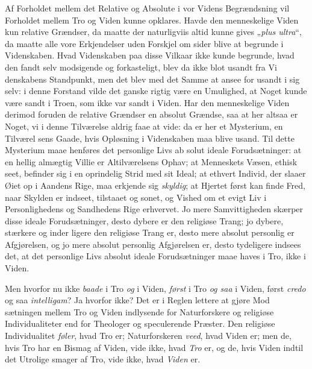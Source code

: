 \documentclass[12pt]{book}
\newcommand{\opage}[1]{\marginnote{\footnotesize\textit{[#1]}}}
\begin{document}
Af Forholdet mellem det Relative og Absolute i vor
Videns Begrændsning vil Forholdet mellem Tro og Viden
kunne opklares. Havde den menneskelige Viden kun relative
Grændser, da maatte der naturligviis altid kunne gives „\textit{plus
ultra}“, da maatte alle vore Erkjendelser uden Forskjel om\-%
sider blive at begrunde i Videnskaben. Hvad Videnskaben
paa disse Vilkaar ikke kunde begrunde, hvad den fandt selv\-%
modsigende og forkasteligt, blev da ikke blot usandt fra Vi\-%
denskabens Standpunkt, men det blev med det Samme at
ansee for usandt i sig selv: i denne Forstand vilde det ganske
rigtig være en Umulighed, at Noget kunde være sandt i
Troen, som ikke var sandt i Viden. Har den menneskelige
Viden derimod foruden de relative Grændser en absolut %
Grændse, saa at her altsaa er Noget, vi i denne Tilværelse
aldrig faae at vide: da er her et Mysterium, en Tilværel\-%
sens Gaade, hvis Opløsning i Videnskaben maa blive usand.
Til dette Mysterium maae henføres det personlige Livs ab\-%
solut ideale Forudsætninger: at en hellig almægtig Villie
er Altilværelsens Ophav; at Menneskets Væsen, ethisk seet,
\opage{29}\setcounter{footnote}{0}%
befinder sig i en oprindelig Strid med sit Ideal; at ethvert
Individ, der slaaer Øiet op i Aandens Rige, maa erkjende
sig \emph{skyldig}; at Hjertet først kan finde Fred, naar Skylden
er indseet, tilstaaet og sonet, og Vished om et evigt Liv
i Personlighedens og Sandhedens Rige erhvervet. Jo mere
Samvittigheden skærper disse ideale Forudsætninger, desto
dybere er den religiøse Trang; jo dybere, stærkere og inder\-%
ligere den religiøse Trang er, desto mere absolut personlig
er Afgjørelsen, og jo mere absolut personlig Afgjørelsen er,
desto tydeligere indsees det, at det personlige Livs absolut
ideale Forudsætninger maae haves i Tro, ikke i Viden.

Men hvorfor nu ikke \emph{baade} i Tro \emph{og} i Viden, \emph{først}
i Tro \emph{og saa} i Viden, først \textit{credo} og saa \textit{intelligam}?
Ja hvorfor ikke? Det er i Reglen lettere at gjøre Mod\-%
sætningen mellem Tro og Viden indlysende for Naturforskere
og religiøse Individualiteter end for Theologer og speculerende
Præster. Den religiøse Individualitet \emph{føler}, hvad Tro er;
Naturforskeren \emph{veed}, hvad Viden er; men de, hvis Tro
har en Bismag af Viden, vide ikke, hvad \emph{Tro} er, og de,
hvis Viden indtil det Utrolige smager af Tro, vide ikke,
hvad \emph{Viden} er.
\end{document}
